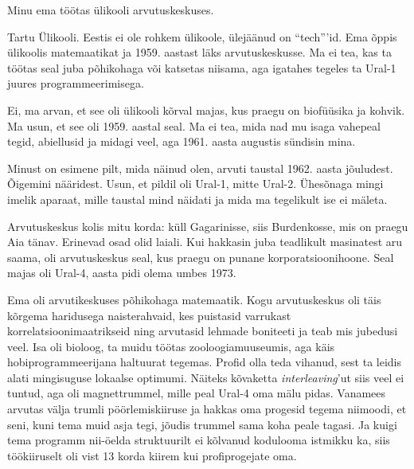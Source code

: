 

Minu ema töötas ülikooli arvutuskeskuses.


Tartu Ülikooli. Eestis ei ole rohkem ülikoole, ülejäänud on 
\enquote{tech}'id. Ema õppis ülikoolis matemaatikat ja 1959. aastast läks 
arvutuskeskusse. Ma ei tea, kas ta töötas seal juba põhikohaga või 
katsetas niisama, aga igatahes tegeles ta Ural-1 juures 
programmeerimisega. 

Ei, ma arvan, et see oli ülikooli kõrval majas, kus praegu on biofüüsika ja 
kohvik. Ma usun, et see oli 1959. aastal seal. Ma ei tea, mida nad mu 
isaga vahepeal tegid, abiellusid ja midagi veel, aga 1961. aasta augustis 
sündisin mina. 

Minust on esimene pilt, mida näinud olen, arvuti taustal 1962. aasta 
jõuludest. Õigemini nääridest. Usun, et pildil oli Ural-1, mitte Ural-2. 
Ühesõnaga mingi imelik aparaat, mille taustal mind näidati ja mida ma 
tegelikult ise ei mäleta. 

Arvutuskeskus kolis mitu korda: küll Gagarinisse, siis Burdenkosse, mis 
on praegu Aia tänav. Erinevad osad olid laiali. Kui hakkasin 
juba teadlikult masinatest aru saama, oli arvutuskeskus seal, kus praegu on 
punane korporatsioonihoone. Seal majas oli Ural-4, aasta pidi olema umbes 1973. 


Ema oli arvutikeskuses põhikohaga matemaatik. Kogu arvutuskeskus oli täis
kõrgema haridusega naisterahvaid, kes puistasid varrukast 
korrelatsioonimaatrikseid ning arvutasid lehmade boniteeti ja teab mis 
jubedusi veel. Isa oli bioloog, 
ta muidu töötas zooloogiamuuseumis, aga käis hobiprogrammeerijana haltuurat tegemas. Profid olla teda vihanud, sest ta leidis alati 
mingisuguse lokaalse optimumi. Näiteks kõvaketta \emph{interleaving}'ut siis 
veel ei tuntud, aga oli magnettrummel, mille peal Ural-4 oma mälu pidas. 
Vanamees arvutas välja trumli pöörlemiskiiruse ja hakkas oma 
progesid tegema niimoodi, et seni, kuni tema muid asja tegi, jõudis trummel sama koha peale tagasi. Ja kuigi tema programm nii-öelda 
struktuurilt ei kõlvanud kodulooma istmikku ka, siis töökiiruselt oli vist 
13 korda kiirem kui profiprogejate oma.

